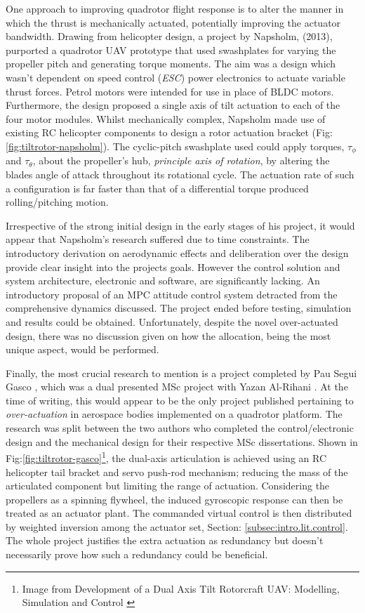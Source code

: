 \par
One approach to improving quadrotor flight response is to alter the manner in which the thrust is mechanically actuated, potentially improving the actuator bandwidth. Drawing from helicopter design, a project by Napsholm, (2013)\cite{napsholm}, purported a quadrotor UAV prototype that used swashplates for varying the propeller pitch and generating torque moments. The aim was a design which wasn't dependent on speed control (\emph{ESC}) power electronics to actuate variable thrust forces. Petrol motors were intended for use in place of BLDC motors. Furthermore, the design proposed a single axis of tilt actuation to each of the four motor modules. Whilst mechanically complex, Napsholm made use of existing RC helicopter components to design a rotor actuation bracket (Fig:\ref{fig:tiltrotor-napsholm}). The cyclic-pitch swashplate used \cite{autonomousrobotspitch} could apply torques, $\tau_{\phi}$ and $\tau_{\theta}$, about the propeller's hub, \emph{principle axis of rotation}, by altering the blades angle of attack throughout its rotational cycle. The actuation rate of such a configuration is far faster than that of a differential torque produced rolling/pitching motion.
\par
Irrespective of the strong initial design in the early stages of his project, it would appear that Napsholm's research suffered due to time constraints. The introductory derivation on aerodynamic effects and deliberation over the design provide clear insight into the projects goals. However the control solution and system architecture, electronic and software, are significantly lacking. An introductory proposal of an MPC attitude control system detracted from the comprehensive dynamics discussed. The project ended before testing, simulation and results could be obtained. Unfortunately, despite the novel over-actuated design, there was no discussion given on how the allocation, being the most unique aspect, would be performed.
\par
Finally, the most crucial research to mention is a project completed by Pau Segui Gasco \cite{tiltgasco}, which was a dual presented MSc project with Yazan Al-Rihani \cite{tiltrihani}. At the time of writing, this would appear to be the only project published pertaining to \emph{over-actuation} in aerospace bodies implemented on a quadrotor platform. The research was split between the two authors who completed the control/electronic design and the mechanical design for their respective MSc dissertations. Shown in Fig:\ref{fig:tiltrotor-gasco}\footnote{Image from Development of a Dual Axis Tilt Rotorcraft UAV: Modelling, Simulation and Control \cite{tiltgasco}}, the dual-axis articulation is achieved using an RC helicopter tail bracket and servo push-rod mechanism; reducing the mass of the articulated component but limiting the range of actuation. Considering the propellers as a spinning flywheel, the induced gyroscopic response can then be treated as an actuator plant. The commanded virtual control is then distributed by weighted inversion among the actuator set, Section: \ref{subsec:intro.lit.control}. The whole project justifies the extra actuation as redundancy but doesn't necessarily prove how such a redundancy could be beneficial.
